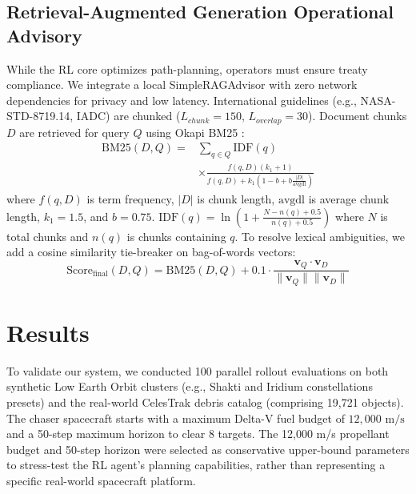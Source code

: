 \documentclass[10pt,conference,a4paper]{IEEEtran}
\begin{document}
\subsection{Retrieval-Augmented Generation Operational Advisory}
While the RL core optimizes path-planning, operators must ensure treaty compliance. We integrate a local SimpleRAGAdvisor with zero network dependencies for privacy and low latency. International guidelines (e.g., NASA-STD-8719.14, IADC) are chunked ($L_{chunk}=150$, $L_{overlap}=30$). Document chunks $D$ are retrieved for query $Q$ using Okapi BM25 \cite{bm25}:
{\small
\begin{equation}
\begin{aligned}
\text{BM25}(D, Q) = &\sum_{q \in Q} \text{IDF}(q) \\
&\times \frac{f(q, D)(k_1 + 1)}{f(q, D) + k_1 \left(1 - b + b \frac{|D|}{\text{avgdl}}\right)}
\end{aligned}
\end{equation}
}
where $f(q, D)$ is term frequency, $|D|$ is chunk length, $\text{avgdl}$ is average chunk length, $k_1 = 1.5$, and $b = 0.75$. $\text{IDF}(q) = \ln\left(1 + \frac{N - n(q) + 0.5}{n(q) + 0.5}\right)$ where $N$ is total chunks and $n(q)$ is chunks containing $q$. To resolve lexical ambiguities, we add a cosine similarity tie-breaker on bag-of-words vectors:
{\small
\begin{equation}
\text{Score}_{\text{final}}(D, Q) = \text{BM25}(D, Q) + 0.1 \cdot \frac{\mathbf{v}_Q \cdot \mathbf{v}_D}{\|\mathbf{v}_Q\| \|\mathbf{v}_D\|}
\end{equation}
}

\section{Results}
To validate our system, we conducted 100 parallel rollout evaluations on both synthetic Low Earth Orbit clusters (e.g., Shakti and Iridium constellations presets) and the real-world CelesTrak \cite{celestrak} debris catalog (comprising 19,721 objects). The chaser spacecraft starts with a maximum Delta-V fuel budget of $12,000\text{ m/s}$ and a 50-step maximum horizon to clear 8 targets. The 12,000 m/s propellant budget and 50-step horizon were selected as conservative upper-bound parameters to stress-test the RL agent's planning capabilities, rather than representing a specific real-world spacecraft platform.
\end{document}

